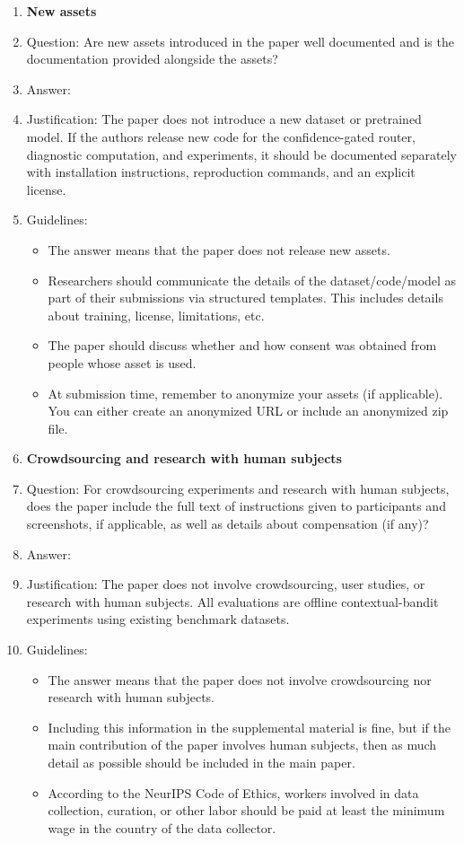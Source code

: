 \documentclass{article}
\theoremstyle{definition}
\theoremstyle{remark}
\theoremstyle{remark}
\begin{document}
\begin{enumerate}
\item {\bf New assets}
    \item[] Question: Are new assets introduced in the paper well documented and is the documentation provided alongside the assets?
    \item[] Answer: \answerNA{} %
    \item[] Justification: The paper does not introduce a new dataset or pretrained model. If the authors release new code for the confidence-gated router, diagnostic computation, and experiments, it should be documented separately with installation instructions, reproduction commands, and an explicit license.
    \item[] Guidelines:
    \begin{itemize}
        \item The answer \answerNA{} means that the paper does not release new assets.
        \item Researchers should communicate the details of the dataset\slash code\slash model as part of their submissions via structured templates. This includes details about training, license, limitations, etc. 
        \item The paper should discuss whether and how consent was obtained from people whose asset is used.
        \item At submission time, remember to anonymize your assets (if applicable). You can either create an anonymized URL or include an anonymized zip file.
    \end{itemize}

\item {\bf Crowdsourcing and research with human subjects}
    \item[] Question: For crowdsourcing experiments and research with human subjects, does the paper include the full text of instructions given to participants and screenshots, if applicable, as well as details about compensation (if any)? 
    \item[] Answer: \answerNA{} %
    \item[] Justification: The paper does not involve crowdsourcing, user studies, or research with human subjects. All evaluations are offline contextual-bandit experiments using existing benchmark datasets.
    \item[] Guidelines:
    \begin{itemize}
        \item The answer \answerNA{} means that the paper does not involve crowdsourcing nor research with human subjects.
        \item Including this information in the supplemental material is fine, but if the main contribution of the paper involves human subjects, then as much detail as possible should be included in the main paper. 
        \item According to the NeurIPS Code of Ethics, workers involved in data collection, curation, or other labor should be paid at least the minimum wage in the country of the data collector. 
    \end{itemize}


\end{enumerate}
\end{document}
